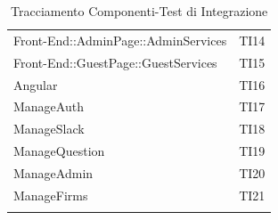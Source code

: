 \documentclass[../PianoDiQualifica_v4.0.0.tex]{subfiles}
\begin{document}
\begin{longtable}[c] { >{\centering\arraybackslash}p{11cm} >{\centering\arraybackslash}p{2cm}}
			\addlinespace[0.3em]
			\midrule
			\addlinespace[0.3em]
			Front-End::AdminPage::AdminServices & TI14\\
			\addlinespace[0.3em]
			\midrule
			\addlinespace[0.3em]
			Front-End::GuestPage::GuestServices & TI15 \\
			\addlinespace[0.3em]
			\midrule
			\addlinespace[0.3em]
			Angular & TI16\\
			\addlinespace[0.3em]
			\midrule
			\addlinespace[0.3em]
			ManageAuth & TI17 \\
			\addlinespace[0.3em]
			\midrule
			\addlinespace[0.3em]
			ManageSlack & TI18 \\
			\addlinespace[0.3em]
			\midrule
			\addlinespace[0.3em]
			ManageQuestion & TI19 \\
			\addlinespace[0.3em]
			\midrule
			\addlinespace[0.3em]
			ManageAdmin & TI20 \\
			\addlinespace[0.3em]
			\midrule
			\addlinespace[0.3em]
			ManageFirms & TI21 \\
			\bottomrule
			\caption{Tracciamento Componenti-Test di Integrazione}
	\end{longtable}

	\newpage
\end{document}
